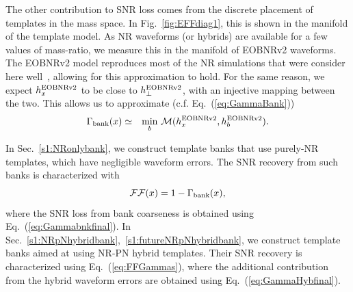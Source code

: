 The other contribution to SNR loss comes from the discrete placement of 
templates in the mass space. In Fig.~\ref{fig:EFFdiag1}, this is shown in the
manifold of the template model. As NR waveforms (or hybrids) are available
for a few values of mass-ratio, we measure this in the manifold of EOBNRv2
waveforms. The EOBNRv2 model reproduces most of the NR simulations that
were consider here well~\cite{BuonannoEOBv2Main}, allowing for this 
approximation to hold. For the same reason, we expect $h^{\mathrm{EOBNRv2}}_x$ to be close to 
$h^{\mathrm{EOBNRv2}}_\perp$, with an injective mapping between the two. This allows us to 
approximate (c.f. Eq.~(\ref{eq:GammaBank}))
\begin{eqnarray}\label{eq:GammaBankEOB}
\label{eq:Gammabnkfinal}
 \Gamma_\bnk(x) &\simeq & \underset{b}{\mn}\,\,\mathcal{M}(h^\EOB_x,h^\EOB_b).
\end{eqnarray}

In Sec.~\ref{s1:NRonlybank}, we construct template banks that use purely-NR
templates, which have negligible waveform errors. The SNR recovery from such 
banks is characterized with
\begin{equation}\label{eq:NRFFGammas}
 \FF(x) = 1 - \Gamma_\bnk(x),
\end{equation}
where the SNR loss from bank coarseness is obtained using 
Eq.~(\ref{eq:Gammabnkfinal}). In 
Sec.~\ref{s1:NRpNhybridbank},~\ref{s1:futureNRpNhybridbank}, we construct 
template banks aimed at using NR-PN hybrid templates. Their SNR recovery is
characterized using Eq.~(\ref{eq:FFGammas}), where the additional contribution
from the hybrid waveform errors are obtained using Eq.~(\ref{eq:GammaHybfinal}).


